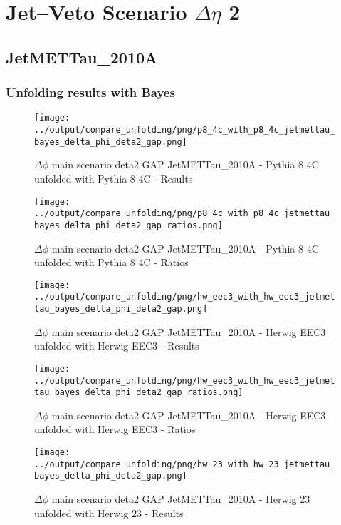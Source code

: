 \documentclass[11pt]{book}
\begin{document}
\cleardoublepage
\chapter{Jet--Veto Scenario $\Delta\eta$ 2}
\section{JetMETTau\_2010A}
\subsection{Unfolding results with Bayes}

\begin{figure}[ht]
\centering
\texttt{[image: ../output/compare\_unfolding/png/p8\_4c\_with\_p8\_4c\_jetmettau\_bayes\_delta\_phi\_deta2\_gap.png]}
\caption{$\Delta\phi$ main scenario deta2 GAP JetMETTau\_2010A - Pythia 8 4C unfolded with Pythia 8 4C - Results}
\label{p8_p8_jetmettau_bayes_delta_phi_deta2_gap_a}
\end{figure}

\begin{figure}[ht]
\centering
\texttt{[image: ../output/compare\_unfolding/png/p8\_4c\_with\_p8\_4c\_jetmettau\_bayes\_delta\_phi\_deta2\_gap\_ratios.png]}
\caption{$\Delta\phi$ main scenario deta2 GAP JetMETTau\_2010A - Pythia 8 4C unfolded with Pythia 8 4C - Ratios}
\label{p8_p8_jetmettau_bayes_delta_phi_deta2_gap_b}
\end{figure}

\begin{figure}[ht]
\centering
\texttt{[image: ../output/compare\_unfolding/png/hw\_eec3\_with\_hw\_eec3\_jetmettau\_bayes\_delta\_phi\_deta2\_gap.png]}
\caption{$\Delta\phi$ main scenario deta2 GAP JetMETTau\_2010A - Herwig EEC3 unfolded with Herwig EEC3 - Results}
\label{hw_eec3_hw_eec3_jetmettau_bayes_delta_phi_deta2_gap_a}
\end{figure}

\begin{figure}[ht]
\centering
\texttt{[image: ../output/compare\_unfolding/png/hw\_eec3\_with\_hw\_eec3\_jetmettau\_bayes\_delta\_phi\_deta2\_gap\_ratios.png]}
\caption{$\Delta\phi$ main scenario deta2 GAP JetMETTau\_2010A - Herwig EEC3 unfolded with Herwig EEC3 - Ratios}
\label{hw_eec3_hw_eec3_jetmettau_bayes_delta_phi_deta2_gap_b}
\end{figure}

\begin{figure}[ht]
\centering
\texttt{[image: ../output/compare\_unfolding/png/hw\_23\_with\_hw\_23\_jetmettau\_bayes\_delta\_phi\_deta2\_gap.png]}
\caption{$\Delta\phi$ main scenario deta2 GAP JetMETTau\_2010A - Herwig 23 unfolded with Herwig 23 - Results}
\label{hw_23_hw_23_jetmettau_bayes_delta_phi_deta2_gap_a}
\end{figure}
\end{document}
